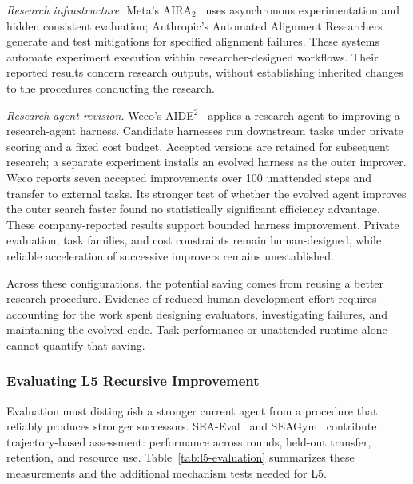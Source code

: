 \emph{Research infrastructure.} Meta's AIRA$_2$~\cite{hambardzumyan2026aira2} uses asynchronous experimentation and hidden consistent evaluation; Anthropic's Automated Alignment Researchers~\cite{chen2026automatedresearchers} generate and test mitigations for specified alignment failures. These systems automate experiment execution within researcher-designed workflows. Their reported results concern research outputs, without establishing inherited changes to the procedures conducting the research.

\emph{Research-agent revision.} Weco's AIDE$^{2}$~\cite{weco2026aide2} applies a research agent to improving a research-agent harness. Candidate harnesses run downstream tasks under private scoring and a fixed cost budget. Accepted versions are retained for subsequent research; a separate experiment installs an evolved harness as the outer improver. Weco reports seven accepted improvements over 100 unattended steps and transfer to external tasks. Its stronger test of whether the evolved agent improves the outer search faster found no statistically significant efficiency advantage. These company-reported results support bounded harness improvement. Private evaluation, task families, and cost constraints remain human-designed, while reliable acceleration of successive improvers remains unestablished.

Across these configurations, the potential saving comes from reusing a better research procedure. Evidence of reduced human development effort requires accounting for the work spent designing evaluators, investigating failures, and maintaining the evolved code. Task performance or unattended runtime alone cannot quantify that saving.

\subsubsection{Evaluating L5 Recursive Improvement}
Evaluation must distinguish a stronger current agent from a procedure that reliably produces stronger successors. SEA-Eval~\cite{jiang2026sea} and SEAGym~\cite{zheng2026seagym} contribute trajectory-based assessment: performance across rounds, held-out transfer, retention, and resource use. Table~\ref{tab:l5-evaluation} summarizes these measurements and the additional mechanism tests needed for L5.

